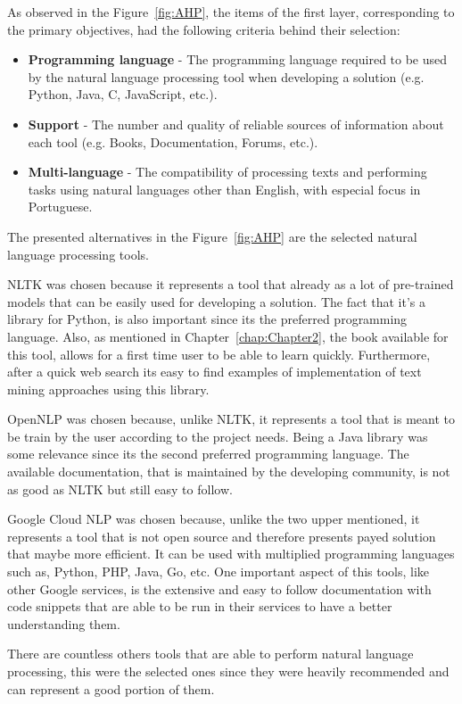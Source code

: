 As observed in the Figure~\ref{fig:AHP}, the items of the first layer, corresponding to the primary objectives, had the following criteria behind their selection:
\begin{itemize}
    \item \textbf{Programming language} - The programming language required to be used by the natural language processing tool when developing a solution (e.g. Python, Java, C, JavaScript, etc.).
    \item \textbf{Support} - The number and quality of reliable sources of information about each tool (e.g. Books, Documentation, Forums, etc.).
    \item \textbf{Multi-language} - The compatibility of processing texts and performing tasks using natural languages other than English, with especial focus in Portuguese.
\end{itemize}

The presented alternatives in the Figure~\ref{fig:AHP} are the selected natural language processing tools.

NLTK was chosen because it represents a tool that already as a lot of pre-trained models that can be easily used for developing a solution.
The fact that  it's a library for Python, is also important since its the preferred programming language.
Also, as mentioned in Chapter~\ref{chap:Chapter2}, the book available for this tool, allows for a first time user to be able to learn quickly.
Furthermore, after a quick web search its easy to find examples of implementation of text mining approaches using this library.

OpenNLP was chosen because, unlike NLTK, it represents a tool that is meant to be train by the user according to the project needs.
Being a Java library was some relevance since its the second preferred programming language.
The available documentation, that is maintained by the developing community, is not as good as NLTK but still easy to follow.

Google Cloud NLP was chosen because, unlike the two upper mentioned, it represents a tool that is not open source and therefore presents payed solution that maybe more efficient.
It can be used with multiplied programming languages such as, Python, PHP, Java, Go, etc.
One important aspect of this tools, like other Google services, is the extensive and easy to follow documentation with code snippets that are able to be run in their services to have a better understanding them.

There are countless others tools that are able to perform natural language processing, this were the selected ones since they were heavily recommended and can represent a good portion of them.

